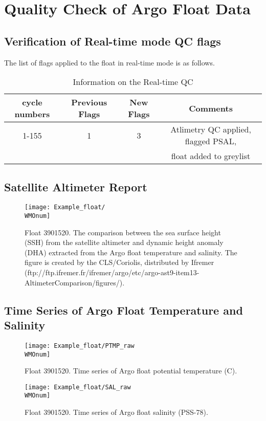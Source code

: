 \documentclass{article}
\newcommand{\WMOnum}{3901520} %
\begin{document}
\begin{flushleft}
\begin{table}[!ht]
\begin{tabular}{|c|c|}
\end{tabular}
	\end{table}

\newpage
\section{Quality Check of Argo Float Data}
\subsection{Verification of Real-time mode QC flags}

The list of flags applied to the float in real-time mode is as follows.
\begin{table}[!ht]%
\caption{Information on the Real-time QC}
\label{tab1}
	\centering
\begin{tabular}{|c|c|c|c|}
	\hline
	{cycle numbers} &  {Previous Flags}& {New Flags}& {Comments} \\ \hline
	{1-155}&  {1} &  {3} &  {Atlimetry QC applied, flagged PSAL,}\\ 
	& & & {float added to greylist} \\ \hline
\end{tabular}
	\end{table}	

\subsection{Satellite Altimeter Report}
\begin{figure}[H]
    \centering    
    \texttt{[image: Example\_float/\\WMOnum]}
    \caption{Float \WMOnum. The comparison between the sea surface height (SSH) from the satellite altimeter and dynamic height anomaly (DHA) extracted from the Argo float temperature and salinity. The figure is created by the CLS/Coriolis, distributed by Ifremer (ftp://ftp.ifremer.fr/ifremer/argo/etc/argo-ast9-item13-AltimeterComparison/figures/).}
    \label{Altim}
\end{figure}
\subsection{Time Series of Argo Float Temperature and Salinity}
\begin{figure}[H]
    \centering    
    \texttt{[image: Example\_float/PTMP\_raw\\WMOnum]}
    \caption{Float \WMOnum. Time series of Argo float potential temperature (\textdegree C).}
    \label{TempWaterflow}
\end{figure}
\begin{figure}[H]
    \centering    
    \texttt{[image: Example\_float/SAL\_raw\\WMOnum]}
    \caption{Float \WMOnum. Time series of Argo float  salinity (PSS-78).}
    \label{SALWaterflow}
\end{figure}

\end{flushleft}
\end{document}
